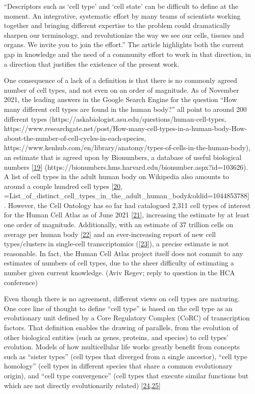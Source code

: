 ``Descriptors such as `cell type' and `cell state' can be difficult to define at the moment. An integrative, systematic effort by many teams of scientists working together and bringing different expertise to the problem could dramatically sharpen our terminology, and revolutionize the way we see our cells, tissues and organs. We invite you to join the effort.''
The article highlights both the current gap in knowledge and the need of a community effort to work in that direction, in a direction that justifies the existence of the present work.

One consequence of a lack of a definition is that there is no commonly agreed number of cell types, and not even on an order of magnitude.
As of November 2021, the leading answers in the Google Search Engine for the question ``How many different cell types are found in the human body?'' all point to around 200 different types (https://askabiologist.asu.edu/questions/human-cell-types, https://www.researchgate.net/post/How-many-cell-types-in-a-human-body-How-about-the-number-of-cell-cycles-in-each-species, https://www.kenhub.com/en/library/anatomy/types-of-cells-in-the-human-body), an estimate that is agreed upon by Bionumbers, a database of useful biological numbers {[}\protect\hyperlink{ref-SprCx2w6}{19}{]} (https://bionumbers.hms.harvard.edu/bionumber.aspx?id=103626).
A list of cell types in the adult human body on Wikipedia also amounts to around a couple hundred cell types {[}\protect\hyperlink{ref-uYuz0opI}{20}, =List\_of\_distinct\_cell\_types\_in\_the\_adult\_human\_body\&oldid=1044853788{]}.
However, the Cell Ontology has so far had catalogued 2,311 cell types of interest for the Human Cell Atlas as of June 2021 {[}\protect\hyperlink{ref-J5X2Xu6M}{21}{]}, increasing the estimate by at least one order of magnitude.
Additionally, with an estimate of 37 trillion cells on average per human body {[}\protect\hyperlink{ref-xWhvkd3B}{22}{]} and an ever-increasing report of new cell types/clusters in single-cell transcriptomics ({[}\protect\hyperlink{ref-HFiosSKK}{23}{]}), a precise estimate is not reasonable.
In fact, the Human Cell Atlas project itself does not commit to any estimates of numbers of cell types, due to the sheer difficulty of estimating a number given current knowledge. (Aviv Regev; reply to question in the HCA conference)

Even though there is no agreement, different views on cell types are maturing.
One core line of thought to define ``cell type'' is based on the cell type as an evolutionary unit defined by a Core Regulatory Complex (CoRC) of transcription factors. That definition enables the drawing of parallels, from the evolution of other biological entities (such as genes, proteins, and species) to cell types' evolution. Models of how multicellular life works greatly benefit from concepts such as ``sister types'' (cell types that diverged from a single ancestor), ``cell type homology'' (cell types in different species that share a common evolutionary origin), and ``cell type convergence'' (cell types that execute similar functions but which are not directly evolutionarily related) {[}\protect\hyperlink{ref-O95WN4x0}{24},\protect\hyperlink{ref-ogAGO9KH}{25}{]}


